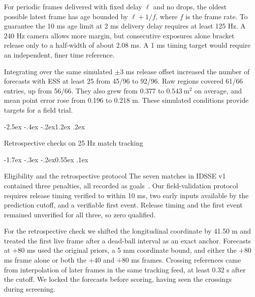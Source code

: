 \documentclass[11pt,letterpaper]{article}
\makeatletter
\renewcommand{\section}{\reserveheadroom\@startsection{section}{1}{\z@}
  {-2.5ex \@plus -.4ex \@minus -.2ex}{1.2ex \@plus .2ex}
  {\normalfont\Large\bfseries\color{black}\raggedright}}
\renewcommand{\subsection}{\reserveheadroom\@startsection{subsection}{2}{\z@}
  {-1.7ex \@plus -.3ex \@minus -.2ex}{0.55ex \@plus .1ex}
  {\normalfont\normalsize\sffamily\bfseries\color{black}\raggedright}}
\newcommand{\reserveheadroom}{\par\ifdim\dimexpr\pagegoal-\pagetotal\relax<5\baselineskip\newpage\fi}
\makeatother
\begin{document}
For periodic frames delivered with fixed delay \(\ell\) and no drops, the oldest possible latest frame has age bounded by \(\ell+1/f\), where \(f\) is the frame rate. To guarantee the 10 ms age limit at 2 ms delivery delay requires at least 125 Hz. A 240 Hz camera allows more margin, but consecutive exposures alone bracket release only to a half-width of about 2.08 ms. A 1 ms timing target would require an independent, finer time reference.

Integrating over the same simulated \(\pm3\) ms release offset increased the number of forecasts with ESS at least 25 from 45/96 to 92/96. Raw regions covered 61/66 entries, up from 56/66. They also grew from 0.377 to \(0.543\ \mathrm{m^2}\) on average, and mean point error rose from 0.196 to 0.218 m. These simulated conditions provide targets for a field trial.


\reserveheadroom
\section{Retrospective checks on 25 Hz match tracking}
\label{app:field}

\subsection{Eligibility and the retrospective protocol}
The seven matches in IDSSE v1 contained three penalties, all recorded as goals~\cite{bassek}. Our field-validation protocol requires release timing verified to within 10 ms, two early inputs available by the prediction cutoff, and a verifiable first event. Release timing and the first event remained unverified for all three, so zero qualified.

For the retrospective check we shifted the longitudinal coordinate by 41.50 m and treated the first live frame after a dead-ball interval as an exact anchor. Forecasts at \(+80\) ms used the original priors, a 5 mm coordinate bound, and either the \(+80\) ms frame alone or both the \(+40\) and \(+80\) ms frames. Crossing references came from interpolation of later frames in the same tracking feed, at least 0.32 s after the cutoff. We locked the forecasts before scoring, having seen the crossings during screening.
\end{document}

